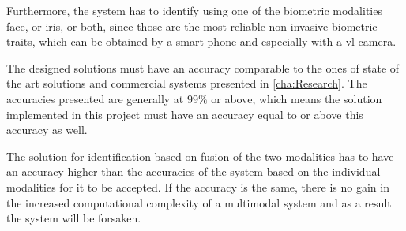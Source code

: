 Furthermore, the system has to identify using one of the biometric modalities face, or iris, or both, since those are the most reliable non-invasive biometric traits, which can be obtained by a smart phone and especially with a \gls{vl} camera. 

The designed solutions must have an accuracy comparable to the ones of state of the art solutions and commercial systems presented in \autoref{cha:Research}. The accuracies presented are generally at $99\%$ or above, which means the solution implemented in this project must have an accuracy equal to or above this accuracy as well. 

The solution for identification based on fusion of the two modalities has to have an accuracy higher than the accuracies of the system based on the individual modalities for it to be accepted. If the accuracy is the same, there is no gain in the increased computational complexity of a multimodal system and as a result the system will be forsaken. 

